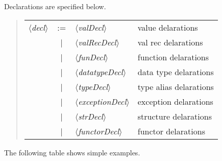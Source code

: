 \documentclass{jbook}
\newcommand{\vbar}{\mbox{\ $|$\ }}
\newcommand{\nonterm}[1]{\mbox{$\langle$}{\it #1}\mbox{$\rangle$}}
\begin{document}
	Declarations are specified below.
\begin{quote}
\begin{tabular}[t]{lcll}
\nonterm{decl} &:=& \nonterm{valDecl} & value delarations
\\&\vbar& \nonterm{valRecDecl} & val rec delarations
\\&\vbar& \nonterm{funDecl} & function delarations
\\&\vbar& \nonterm{datatypeDecl} & data type delarations
\\&\vbar& \nonterm{typeDecl} & type alias delarations
\\&\vbar& \nonterm{exceptionDecl} & exception delarations
\\&\vbar& \nonterm{strDecl}  & structure delarations
\\&\vbar& \nonterm{functorDecl}& functor delarations
\end{tabular}
\end{quote}
	The following table shows simple examples.
\fi%
\end{document}

